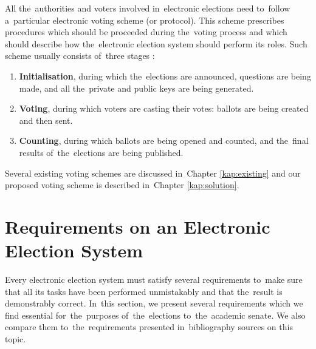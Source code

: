 All the~authorities and voters involved in~electronic elections need to~follow a~particular electronic voting scheme (or protocol). This scheme prescribes procedures which should be proceeded during the~voting process and which should describe how the~electronic election system should perform its roles. 
Such scheme usually consists of~three stages \cite{Rjaskova}:
\begin{enumerate}
\item \textbf{Initialisation}, during which the~elections are announced, questions are being made, and all the~private and public keys are being generated. 
\item \textbf{Voting}, during which voters are casting their votes: ballots are being created and then sent.
\item \textbf{Counting}, during which ballots are being opened and counted, and the~final results of~the~elections are being published.
\end{enumerate}

Several existing voting schemes are discussed in~Chapter \ref{kap:existing} and our proposed voting scheme is described in~Chapter \ref{kap:solution}.

\section{Requirements on an Electronic Election System}

\label{sec:requirements}

Every electronic election system must satisfy several requirements to~make sure that all its tasks have been performed unmistakably and that the~result is demonstrably correct. In~this section, we present several requirements which we find essential for~the~purposes of~the~elections to~the~academic senate. We also compare them to~the~requirements presented in~bibliography sources on this topic. %

